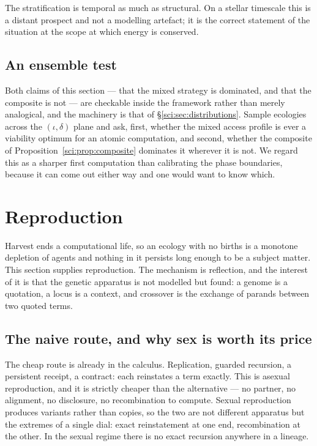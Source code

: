 The stratification is temporal as much as structural. On a stellar timescale this is a distant
prospect and not a modelling artefact; it is the correct statement of the situation at the scope at
which energy is conserved.

\subsection{An ensemble test}\label{sci:S11.7}

Both claims of this section --- that the mixed strategy is dominated, and that the composite is not
--- are checkable inside the framework rather than merely analogical, and the machinery is that of
\S\ref{sci:sec:distributions}. Sample ecologies across the $(\iota, \delta)$ plane and ask, first, whether
the mixed access profile is ever a viability optimum for an atomic computation, and second, whether the
composite of Proposition~\ref{sci:prop:composite} dominates it wherever it is not. We regard this as a
sharper first computation than calibrating the phase boundaries, because it can come out either way
and one would want to know which.

\section{Reproduction}\label{sci:S12}
\label{sci:sec:repro}

Harvest ends a computational life, so an ecology with no births is a monotone depletion of agents and
nothing in it persists long enough to be a subject matter. This section supplies reproduction. The
mechanism is reflection, and the interest of it is that the genetic apparatus is not modelled but
found: a genome is a quotation, a locus is a context, and crossover is the exchange of parands between
two quoted terms.

\subsection{The naive route, and why sex is worth its price}\label{sci:S12.1}

The cheap route is already in the calculus. Replication, guarded recursion, a persistent receipt, a
contract: each reinstates a term exactly. This is asexual reproduction, and it is strictly cheaper
than the alternative --- no partner, no alignment, no disclosure, no recombination to compute.
Sexual reproduction produces variants rather than copies, so the two are not different apparatus but
the extremes of a single dial: exact reinstatement at one end, recombination at the other. In the
sexual regime there is no exact recursion anywhere in a lineage.

